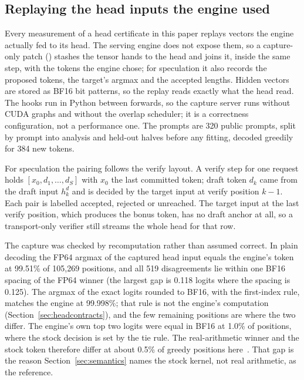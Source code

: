 \subsection{Replaying the head inputs the engine used}\label{sec:transport-capture}
Every measurement of a head certificate in this paper replays vectors the engine actually fed to its head. The serving engine does not expose them, so a capture-only patch () stashes the tensor  hands to the head and joins it, inside the same step, with the tokens the engine chose; for speculation it also records the proposed tokens, the target's argmax and the accepted lengths. Hidden vectors are stored as BF16 bit patterns, so the replay reads exactly what the head read. The hooks run in Python between forwards, so the capture server runs without CUDA graphs and without the overlap scheduler; it is a correctness configuration, not a performance one. The prompts are 320 public prompts, split by prompt into analysis and held-out halves before any fitting, decoded greedily for 384 new tokens.

For speculation the pairing follows the verify layout. A verify step for one request holds $[x_0,d_1,\dots,d_S]$ with $x_0$ the last committed token; draft token $d_k$ came from the draft input $h^d_k$ and is decided by the target input at verify position $k-1$. Each pair is labelled accepted, rejected or unreached. The target input at the last verify position, which produces the bonus token, has no draft anchor at all, so a transport-only verifier still streams the whole head for that row.

The capture was checked by recomputation rather than assumed correct. In plain decoding the FP64 argmax of the captured head input equals the engine's token at 99.51\% of 105,269 positions, and all 519 disagreements lie within one BF16 spacing of the FP64 winner (the largest gap is 0.118 logits where the spacing is 0.125). The argmax of the exact logits rounded to BF16, with the first-index rule, matches the engine at 99.998\%; that rule is not the engine's computation (Section~\ref{sec:headcontracts}), and the few remaining positions are where the two differ. The engine's own top two logits were equal in BF16 at 1.0\% of positions, where the stock decision is set by the tie rule. The real-arithmetic winner and the stock token therefore differ at about 0.5\% of greedy positions here~. That gap is the reason Section~\ref{sec:semantics} names the stock kernel, not real arithmetic, as the reference.
